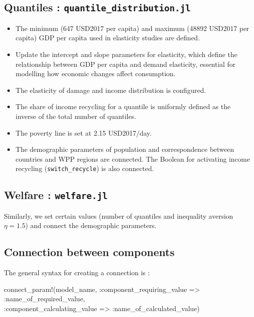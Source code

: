 \documentclass[
]{article}
\newenvironment{Shaded}{}{}
\newcommand{\FunctionTok}[1]{\textcolor[rgb]{0.02,0.16,0.49}{#1}}
\newcommand{\NormalTok}[1]{#1}
\newcommand{\OperatorTok}[1]{\textcolor[rgb]{0.40,0.40,0.40}{#1}}
\providecommand{\tightlist}{%
  \setlength{\itemsep}{0pt}\setlength{\parskip}{0pt}}
\begin{document}
\subsection{\texorpdfstring{Quantiles :
\texttt{quantile\_distribution.jl}}{Quantiles : quantile\_distribution.jl}}\label{quantiles-quantile_distribution.jl}

\begin{itemize}
\tightlist
\item
  The minimum (647 USD2017 per capita) and maximum (48892 USD2017 per
  capita) GDP per capita used in elasticity studies are defined.
\item
  Update the intercept and slope parameters for elasticity, which define
  the relationship between GDP per capita and demand elasticity,
  essential for modelling how economic changes affect consumption.
\item
  The elasticity of damage and income distribution is configured.
\item
  The share of income recycling for a quantile is uniformly defined as
  the inverse of the total number of quantiles.
\item
  The poverty line is set at 2.15 USD2017/day.
\item
  The demographic parameters of population and correspondence between
  countries and WPP regions are connected. The Boolean for activating
  income recycling (\texttt{switch\_recycle}) is also connected.
\end{itemize}

\subsection{\texorpdfstring{Welfare :
\texttt{welfare.jl}}{Welfare : welfare.jl}}\label{welfare-welfare.jl}

Similarly, we set certain values (number of quantiles and inequality
aversion \(\eta = 1.5\)) and connect the demographic parameters.

\subsection{Connection between
components}\label{connection-between-components}

The general syntax for creating a connection is :

\begin{Shaded}
\begin{Highlighting}[]
\FunctionTok{connect\_param!}\NormalTok{(model\_name, }\OperatorTok{:}\NormalTok{component\_requiring\_value }\OperatorTok{=\textgreater{}} \OperatorTok{:}\NormalTok{name\_of\_required\_value, } \\
\OperatorTok{:}\NormalTok{component\_calculating\_value }\OperatorTok{=\textgreater{}} \OperatorTok{:}\NormalTok{name\_of\_calculated\_value)}
\end{Highlighting}
\end{Shaded}
\end{document}
